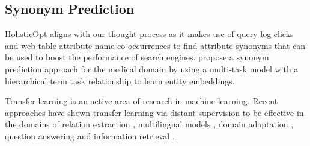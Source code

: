 \subsection{Synonym Prediction}
HolisticOpt \cite{he2016automatic} aligns with our thought process as it makes use of query log clicks and web table attribute name co-occurrences to find attribute synonyms that can be used to boost the performance of search engines. \citeauthor{10.1145/3292500.3330914} propose a synonym prediction approach for the medical domain by using a multi-task model with a hierarchical term task relationship to learn entity embeddings.

Transfer learning is an active area of research in machine learning. Recent approaches have shown transfer learning via distant supervision to be effective in the domains of relation extraction \cite{Mintz2009DistantSF, Ji2017DistantSF}, multilingual models \cite{Hedderich2020TransferLA},  domain adaptation \cite{zhang2020multi}, question answering \cite{reddy2020end} and information retrieval \cite{Mitra2020NeuralMF}.








